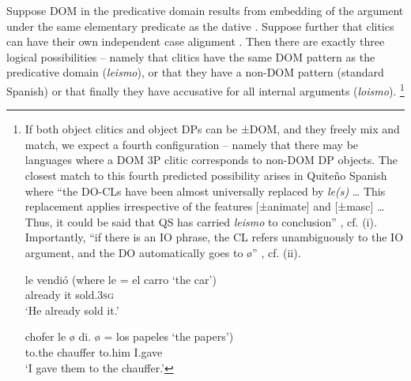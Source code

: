 \documentclass[output=paper]{langscibook}
\begin{document}
Suppose DOM in the predicative domain results from embedding of the argument under the same elementary predicate as the dative . Suppose further that clitics can have their own independent case alignment . Then there are exactly three logical possibilities – namely that clitics have the same DOM pattern as the predicative domain (\textit{leismo}), or that they have a non-DOM pattern (standard Spanish) or that finally they have accusative for all internal arguments (\textit{loismo}).{} \footnote{If both object clitics and object DPs can be ±DOM, and they freely mix and match, we expect a fourth configuration – namely that there may be languages where a DOM 3P clitic corresponds to non-DOM DP objects. The closest match to this fourth predicted possibility arises in Quiteño Spanish where “the DO-CLs have been almost universally replaced by \textit{le(s)} … This replacement applies irrespective of the features [±animate] and [±masc] …Thus, it could be said that QS has carried \textit{leismo} to conclusion” \citep[387-388]{Suñer1989}, cf. (i). Importantly, “if there is an IO phrase, the CL refers unambiguously to the IO argument, and the DO automatically goes to ø” \citep[389]{Suñer1989}, cf. (ii).  

\ea\label{ex:manzini:}
{} {le}   {vendió}      \hfill (where {le} {=} {el} {carro} ‘the car’)\\
already   it   sold\textsc{.3sg}\\
\glt ‘He already sold it.’
\z

\ea\label{ex:manzini:}
{} {chofer}     {le}   {ø} {di.}   {ø} = {los} {papeles} ‘the papers’)\\
to.the chauffer   to.him   {} I.gave\\
\glt ‘I gave them to the chauffer.’
\z
}
\end{document}
